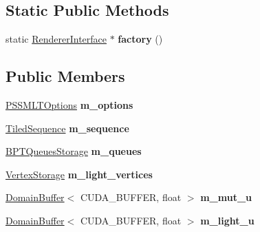 \subsection*{Static Public Methods}
\begin{DoxyCompactItemize}
\item 
\mbox{\label{struct_p_s_s_m_l_t_ae25bfda6d5f36795d7546ac131404d21}} 
static \hyperlink{struct_renderer_interface}{Renderer\+Interface} $\ast$ {\bfseries factory} ()
\end{DoxyCompactItemize}
\subsection*{Public Members}
\begin{DoxyCompactItemize}
\item 
\mbox{\label{struct_p_s_s_m_l_t_aa232208c5a744a2e1f23e5def0677f63}} 
\hyperlink{struct_p_s_s_m_l_t_options}{P\+S\+S\+M\+L\+T\+Options} {\bfseries m\+\_\+options}
\item 
\mbox{\label{struct_p_s_s_m_l_t_a0d616db92112a6812ac3140550c812d9}} 
\hyperlink{struct_tiled_sequence}{Tiled\+Sequence} {\bfseries m\+\_\+sequence}
\item 
\mbox{\label{struct_p_s_s_m_l_t_a8edcda0eef1ad84370f610b2dec4778b}} 
\hyperlink{struct_b_p_t_queues_storage}{B\+P\+T\+Queues\+Storage} {\bfseries m\+\_\+queues}
\item 
\mbox{\label{struct_p_s_s_m_l_t_a9c2b9938bbed69e6e1c2f12fb5577bda}} 
\hyperlink{struct_vertex_storage}{Vertex\+Storage} {\bfseries m\+\_\+light\+\_\+vertices}
\item 
\mbox{\label{struct_p_s_s_m_l_t_a7b6d688cd8098420154fbba76b5fd3bc}} 
\hyperlink{class_domain_buffer}{Domain\+Buffer}$<$ C\+U\+D\+A\+\_\+\+B\+U\+F\+F\+ER, float $>$ {\bfseries m\+\_\+mut\+\_\+u}
\item 
\mbox{\label{struct_p_s_s_m_l_t_a9c30d44b67779210542f9dd2c279db8f}} 
\hyperlink{class_domain_buffer}{Domain\+Buffer}$<$ C\+U\+D\+A\+\_\+\+B\+U\+F\+F\+ER, float $>$ {\bfseries m\+\_\+light\+\_\+u}
\item 

\end{DoxyCompactItemize}
